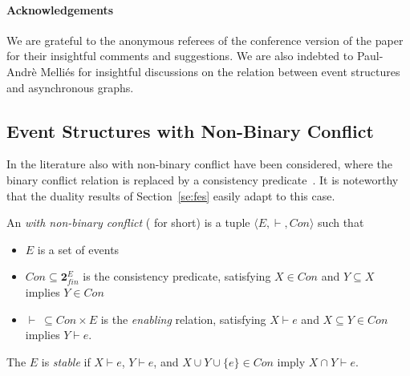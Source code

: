 

\smallskip

\paragraph*{Acknowledgements}
We are grateful to the anonymous referees of the conference version of
the paper for their insightful comments and suggestions. We are also indebted to Paul-Andr\`e Melli\'es for insightful discussions on the relation between event structures and asynchronous graphs.







\appendix

\subsection{Event Structures with Non-Binary Conflict}
\label{app:consistency}

In the literature also {\esabbr} with non-binary conflict have been considered, 
where the binary conflict relation is replaced by a consistency predicate~\cite{Dro:ESD}. 
It is noteworthy that the duality results of Section~\ref{se:fes} easily adapt to this case.

\begin{definition}
  An {\esabbr} \emph{with non-binary conflict} ({\esnabbr} for
  short) is a tuple $\langle E, \vdash, Con \rangle$ such
  that
  \begin{itemize}
  \item $E$ is a set of events
  \item $Con \subseteq \mathbf{2}^E_{fin}$ is the consistency
    predicate, satisfying $X \in Con$ and $Y \subseteq X$ implies $Y
    \in Con$
  \item $\vdash\ \subseteq Con \times E$ is the \emph{enabling}
    relation, satisfying $X \vdash e$ and $X \subseteq Y \in Con$
    implies $Y \vdash e$.
  \end{itemize}
  The {\esnabbr} ${E}$ is \emph{stable} if $X\vdash e$,
  $Y \vdash e$, and $X \cup Y \cup \{e\} \in Con$ imply
  $X \cap Y \vdash e$.
\end{definition}

